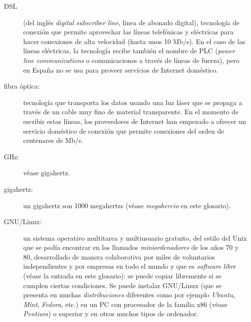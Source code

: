 \begin{description}
\item[DSL] (del inglés \emph{digital subscriber line}, línea de abonado digital), tecnología de conexión que permite aprovechar las líneas telefónicas y eléctricas para hacer conexiones de alta velocidad (hasta unos 10 Mb/s). En el caso de las líneas eléctricas, la tecnología recibe también el nombre de PLC (\emph{power line communications} o comunicaciones a través de líneas de fuerza), pero en España no se usa para proveer servicios de Internet doméstico. 

\item[fibra óptica:] tecnología que transporta los datos usando una luz láser que se propaga a través de un cable muy fino de material transparente. En el momento de escribir estas líneas, los proveedores de Internet han empezado a ofrecer un servicio doméstico de conexión que permite conexiones del orden de centenares de Mb/s. 

\item[GHz:] véase gigahertz. 

\item[gigahertz:] un gigahertz son 1000 megahertzs (véase \emph{megahercio} en este glosario). 

\item[GNU/Linux:] un sistema operativo multitarea y multiusuario gratuito, del estilo del Unix que se podía encontrar en los llamados \emph{miniordenadores} de los años 70 y 80, desarrollado de manera colaborativa por miles de voluntarios independientes y por empresas en todo el mundo y que es \emph{software libre} (véase la entrada en este glosario): se puede copiar libremente si se cumplen ciertas condiciones. Se puede instalar GNU/Linux (que se presenta en muchas \emph{distribuciones} diferentes como por ejemplo \emph{Ubuntu}, \emph{Mint}, \emph{Fedora}, etc.) en un PC con procesador de la familia x86 (véase \emph{Pentium}) o superior y en otros muchos tipos de ordenador. 


\end{description}
